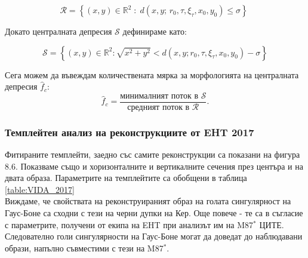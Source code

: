 \begin{equation}
	\mathcal{R}=\left\lbrace
	(x,y)\in\mathbb{R}^2\;:\;d(x,y;\,r_0,\tau,\xi_\tau,x_0,y_0)\leqslant\sigma\right\rbrace\;
\end{equation}

Докато централната депресия $\mathcal{S}$ дефинираме като:

\begin{equation}
	\mathcal{S} = \left\lbrace (x,y)\in\mathbb{R}^2: \sqrt{x^2 + y^2} < d(x,y;r_0,\tau,\xi_\tau,x_0,y_0) - \sigma\right\rbrace
\end{equation}

Сега можем да въвеждам количествената мярка за морфологията на централната депресия $\hat{f}_c$:
\begin{equation}
	\hat{f}_c = \frac{\text{минималният поток в }\mathcal{S}}{\text{средният поток в }\mathcal{R}}.
\end{equation}

\subsubsection{Темплейтен анализ на реконструкциите от EHT 2017}

Фитираните темплейти, заедно със самите реконструкции са показани на фигура 8.6. Показваме също и хоризонталните и вертикалните сечения през центъра и на двата образа. Параметрите на темплейтите са обобщени в таблица \ref{table:VIDA_2017}\\

Виждаме, че свойствата на реконструираният образ на голата сингулярност на Гаус-Боне са сходни с тези на черни дупки на Кер. Още повече - те са в съгласие с параметрите, получени от екипа на EHT при анализът им на M87$^*$ ЦИТЕ. Следователно голи сингулярности на Гаус-Боне могат да доведат до наблюдавани образи, напълно съвместими с тези на M87$^*$.\\

